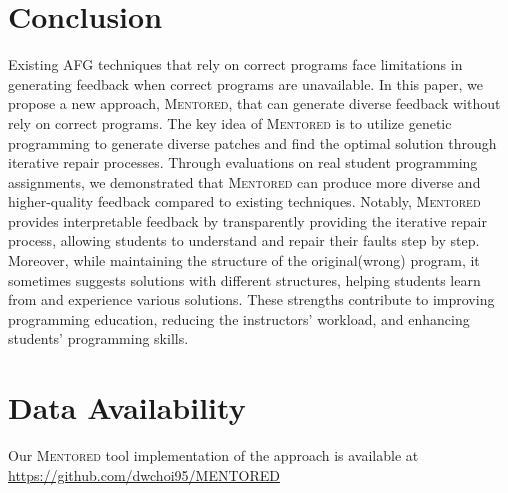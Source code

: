 \documentclass[10pt,conference]{IEEEtran}
\begin{document}
\section{Conclusion}
    Existing AFG techniques that rely on correct programs face limitations in generating feedback when correct programs are unavailable. In this paper, we propose a new approach, \textsc{Mentored}, that can generate diverse feedback without rely on correct programs. The key idea of \textsc{Mentored} is to utilize genetic programming to generate diverse patches and find the optimal solution through iterative repair processes. Through evaluations on real student programming assignments, we demonstrated that \textsc{Mentored} can produce more diverse and higher-quality feedback compared to existing techniques. Notably, \textsc{Mentored} provides interpretable feedback by transparently providing the iterative repair process, allowing students to understand and repair their faults step by step. Moreover, while maintaining the structure of the original(wrong) program, it sometimes suggests solutions with different structures, helping students learn from and experience various solutions. These strengths contribute to improving programming education, reducing the instructors' workload, and enhancing students' programming skills.



\section{Data Availability} \label{tool}
    Our \textsc{Mentored} tool implementation of the approach is available at \url{https://github.com/dwchoi95/MENTORED}
\end{document}
